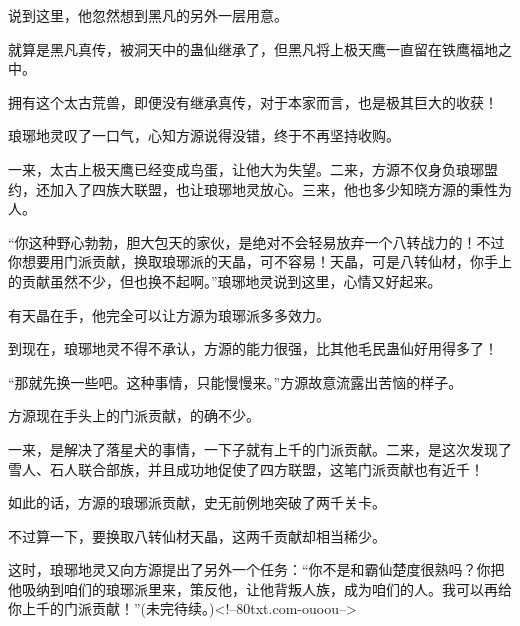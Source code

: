 \begin{this_body}
说到这里，他忽然想到黑凡的另外一层用意。

就算是黑凡真传，被洞天中的蛊仙继承了，但黑凡将上极天鹰一直留在铁鹰福地之中。

拥有这个太古荒兽，即便没有继承真传，对于本家而言，也是极其巨大的收获！

琅琊地灵叹了一口气，心知方源说得没错，终于不再坚持收购。

一来，太古上极天鹰已经变成鸟蛋，让他大为失望。二来，方源不仅身负琅琊盟约，还加入了四族大联盟，也让琅琊地灵放心。三来，他也多少知晓方源的秉性为人。

“你这种野心勃勃，胆大包天的家伙，是绝对不会轻易放弃一个八转战力的！不过你想要用门派贡献，换取琅琊派的天晶，可不容易！天晶，可是八转仙材，你手上的贡献虽然不少，但也换不起啊。”琅琊地灵说到这里，心情又好起来。

有天晶在手，他完全可以让方源为琅琊派多多效力。

到现在，琅琊地灵不得不承认，方源的能力很强，比其他毛民蛊仙好用得多了！

“那就先换一些吧。这种事情，只能慢慢来。”方源故意流露出苦恼的样子。

方源现在手头上的门派贡献，的确不少。

一来，是解决了落星犬的事情，一下子就有上千的门派贡献。二来，是这次发现了雪人、石人联合部族，并且成功地促使了四方联盟，这笔门派贡献也有近千！

如此的话，方源的琅琊派贡献，史无前例地突破了两千关卡。

不过算一下，要换取八转仙材天晶，这两千贡献却相当稀少。

这时，琅琊地灵又向方源提出了另外一个任务：“你不是和霸仙楚度很熟吗？你把他吸纳到咱们的琅琊派里来，策反他，让他背叛人族，成为咱们的人。我可以再给你上千的门派贡献！”(未完待续。)<!--80txt.com-ouoou-->

\end{this_body}


